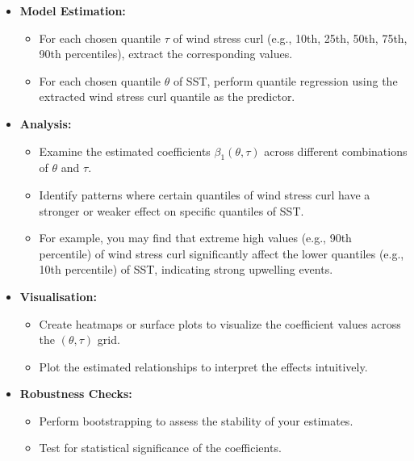 \documentclass[
  letterpaper,
]{book}
\providecommand{\tightlist}{%
  \setlength{\itemsep}{0pt}\setlength{\parskip}{0pt}}\usepackage{longtable,booktabs,array}
\begin{document}
\begin{itemize}
\tightlist
\item
  \textbf{Model Estimation:}

  \begin{itemize}
  \tightlist
  \item
    For each chosen quantile \(\tau\) of wind stress curl (e.g., 10th,
    25th, 50th, 75th, 90th percentiles), extract the corresponding
    values.
  \item
    For each chosen quantile \(\theta\) of SST, perform quantile
    regression using the extracted wind stress curl quantile as the
    predictor.
  \end{itemize}
\item
  \textbf{Analysis:}

  \begin{itemize}
  \tightlist
  \item
    Examine the estimated coefficients \(\beta_1(\theta, \tau)\) across
    different combinations of \(\theta\) and \(\tau\).
  \item
    Identify patterns where certain quantiles of wind stress curl have a
    stronger or weaker effect on specific quantiles of SST.
  \item
    For example, you may find that extreme high values (e.g., 90th
    percentile) of wind stress curl significantly affect the lower
    quantiles (e.g., 10th percentile) of SST, indicating strong
    upwelling events.
  \end{itemize}
\item
  \textbf{Visualisation:}

  \begin{itemize}
  \tightlist
  \item
    Create heatmaps or surface plots to visualize the coefficient values
    across the \((\theta, \tau)\) grid.
  \item
    Plot the estimated relationships to interpret the effects
    intuitively.
  \end{itemize}
\item
  \textbf{Robustness Checks:}

  \begin{itemize}
  \tightlist
  \item
    Perform bootstrapping to assess the stability of your estimates.
  \item
    Test for statistical significance of the coefficients.
  \end{itemize}
\end{itemize}
\end{document}
